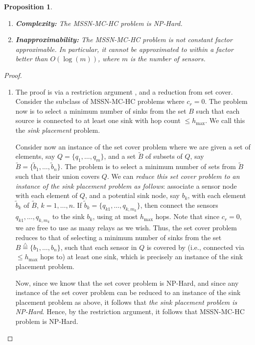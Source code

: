 \documentclass[conference]{IEEEtran}
\newcommand{\define}{\stackrel{\triangle}{=}}
\newcommand{\Btilt}{\tilde{B}}
\newtheorem{proposition}{Proposition}
\begin{document}
\begin{proposition}
\begin{enumerate}
\item \textbf{Complexity: }The MSSN-MC-HC problem is NP-Hard. 
\item \textbf{Inapproximability: }The MSSN-MC-HC problem is not constant factor approximable. In particular, it cannot be approximated to within a factor better than $O(\log(m))$, where $m$ is the number of sensors.
\end{enumerate}
\end{proposition}

\begin{proof}
\begin{enumerate}

\item The proof is via a restriction argument \cite[p. 63, Section 3.2.1]{Garey}, and a reduction from set cover. Consider the subclass of MSSN-MC-HC problems where $c_r = 0$. The problem now is to select a minimum number of sinks from the set $B$ such that each source is connected to at least one sink with hop count $\leq h_{\max}$. We call this the \emph{sink placement} problem.  

Consider now an instance of the set cover problem where we are given a set of elements, say $Q=\{q_1,\ldots, q_m\}$, and a set $\tilde{B}$ of subsets of $Q$, say $\Btilt=\{\tilde{b}_1,\ldots, \tilde{b}_n\}$. The problem is to select a minimum number of sets from $\Btilt$ such that their union covers $Q$. We can \emph{reduce this set cover problem to an instance of the sink placement problem as follows}: associate a sensor node with each element of $Q$, and a potential sink node, say $b_k$, with each element $\tilde{b}_k$ of $\Btilt$, $k=1,\ldots,n$. If $\tilde{b}_k = \{q_{k1},\ldots,q_{k,m_k}\}$, then connect the sensors $q_{k1},\ldots,q_{k,m_k}$ to the sink $b_k$, using at most $h_{\max}$ hops. Note that since $c_r=0$, we are free to use as many relays as we wish. Thus, the set cover problem reduces to that of selecting a minimum number of sinks from the set $B\define\{b_1,\ldots,b_n\}$, such that each sensor in $Q$ is covered by (i.e., connected via $\leq h_{\max}$ hops to) at least one sink, which is precisely an instance of the sink placement problem. 

Now, since we know that the set cover problem is NP-Hard, and since any instance of the set cover problem can be reduced to an instance of the sink placement problem as above, it follows that \emph{the sink placement problem is NP-Hard}. Hence, by the restriction argument, it follows that MSSN-MC-HC problem is NP-Hard. 


\end{enumerate}
\end{proof}
\end{document}
